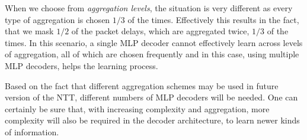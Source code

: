When we choose from \emph{aggregation levels}, the situation is very different as every type of aggregation is chosen $1/3$ of the times. Effectively this results in the fact, that we mask $1/2$ of the packet delays, which are aggregated twice, $1/3$ of the times. In this scenario, a single MLP decoder cannot effectively learn across levels of aggregation, all of which are chosen frequently and in this case, using multiple MLP decoders, helps the learning process. 

Based on the fact that different aggregation schemes may be used in future version of the NTT, different numbers of MLP decoders will be needed. One can certainly be sure that, with increasing complexity and aggregation, more complexity will also be required in the decoder architecture, to learn newer kinds of information.

